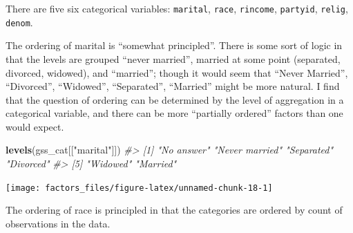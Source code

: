 \documentclass[]{book}
\newenvironment{Shaded}{\begin{snugshade}}{\end{snugshade}}
\newcommand{\CommentTok}[1]{\textcolor[rgb]{0.56,0.35,0.01}{\textit{#1}}}
\newcommand{\DataTypeTok}[1]{\textcolor[rgb]{0.13,0.29,0.53}{#1}}
\newcommand{\KeywordTok}[1]{\textcolor[rgb]{0.13,0.29,0.53}{\textbf{#1}}}
\newcommand{\NormalTok}[1]{#1}
\newcommand{\OperatorTok}[1]{\textcolor[rgb]{0.81,0.36,0.00}{\textbf{#1}}}
\newcommand{\OtherTok}[1]{\textcolor[rgb]{0.56,0.35,0.01}{#1}}
\newcommand{\StringTok}[1]{\textcolor[rgb]{0.31,0.60,0.02}{#1}}
\theoremstyle{plain}
\theoremstyle{remark}
\begin{document}
There are five six categorical variables: \texttt{marital}, \texttt{race}, \texttt{rincome}, \texttt{partyid}, \texttt{relig}, \texttt{denom}.

The ordering of marital is ``somewhat principled''. There is some sort of logic
in that the levels are grouped ``never married'', married at some point
(separated, divorced, widowed), and ``married''; though it would seem that ``Never
Married'', ``Divorced'', ``Widowed'', ``Separated'', ``Married'' might be more natural.
I find that the question of ordering can be determined by the level of
aggregation in a categorical variable, and there can be more ``partially
ordered'' factors than one would expect.

\begin{Shaded}
\begin{Highlighting}[]
\KeywordTok{levels}\NormalTok{(gss_cat[[}\StringTok{"marital"}\NormalTok{]])}
\CommentTok{#> [1] "No answer"     "Never married" "Separated"     "Divorced"     }
\CommentTok{#> [5] "Widowed"       "Married"}
\end{Highlighting}
\end{Shaded}

\begin{Shaded}
\end{Shaded}

\begin{center}\texttt{[image: factors\_files/figure-latex/unnamed-chunk-18-1]} \end{center}

The ordering of race is principled in that the categories are ordered by count of observations in the data.

\begin{Shaded}
\end{Shaded}

\begin{Shaded}
\end{Shaded}
\end{document}

